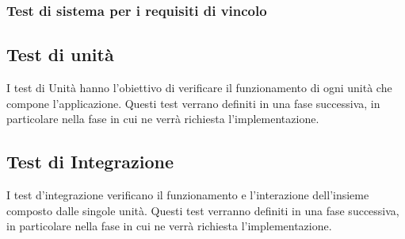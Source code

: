 \subsubsection{Test di sistema per i requisiti di vincolo}
    \def\testspecification{
    {   
        TSOV1,
        Si verifica che il codice sorgente dell'applicazione sia open source,
        NI,
        RVO1
    },
    {   
        TSOV2,
        Si verifica che l'applicazione sia sviluppata in Javascript con l'utilizzo della libreria d3.js,
        NI,
        RVD2 RVD2.1
    },
    {   
        TSDV2.1,
        Si verifica che il backend dell'applicazione sia sviluppato con node.js con l'utilizzo del framework Express,
        NI,
        RVD2.2
    },
    {   
        TSDV2.2,
        Si verifica che il frontend dell'applicazione sia sviluppato con React con l'utilizzo del framework Ant Design,
        NI,
        RVD2.3
    },
    {   
        TSOV3,
        Si verifica che i dati siano convertibili in JSON,
        NI,
        RVO3
    },
    {   
        TSOV4,
        Si verifica che nella visualizzazione Scatter Plot Matrix si possano visualizzare al massimo 5 features,
        NI,
        RVO4
    },
    {   
        TSDV5,
        Si verifica che la libreria per PCA sia ml-pca,
        NI,
        RVD5
    },
    {   
        TSDV6,
        Si verifica che la libreria per Umap sia tsne-js,
        NI,
        RVD6
    },
    {   
        TSDV7,
        Si verifica che la libreria per t-SNE sia tsne-js,
        NI,
        RVD7
    },
    {   
        TSDV8,
        Si verifica che la libreria per le distanze sia ml-distance,
        NI,
        RVD8
    },
    {   
        TSDV9,
        Si verifica che la libreria per la matrice di correlazione sia jeezy,
        NI,
        RVD9
    },
      }
    
    
\subsection{Test di unità}
    I test di Unità hanno l'obiettivo di verificare il funzionamento di ogni unità che compone l'applicazione. Questi test verrano definiti in una fase successiva, in particolare nella fase in cui ne verrà richiesta l'implementazione.
    
\subsection{Test di Integrazione}
    I test d'integrazione verificano il funzionamento e l'interazione dell'insieme composto dalle singole unità. Questi test verranno definiti in una fase successiva, in particolare nella fase in cui ne verrà richiesta l'implementazione.
    
